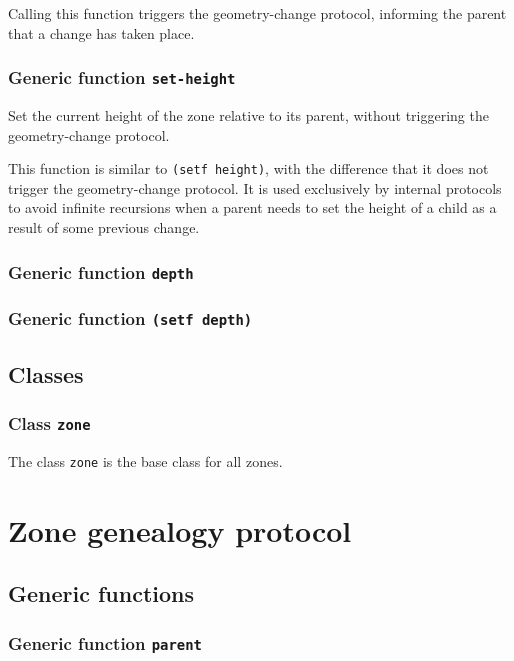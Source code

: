 \documentclass{report}
\begin{document}
Calling this function triggers the geometry-change protocol,
informing the parent that a change has taken place.

\subsubsection{Generic function \texttt{set-height}}

Set the current height of the zone relative to its parent, without
triggering the geometry-change protocol.

This function is similar to \texttt{(setf height)}, with the
difference that it does not trigger the geometry-change protocol.  It
is used exclusively by internal protocols to avoid infinite recursions
when a parent needs to set the height of a child as a result of some
previous change.

\subsubsection{Generic function \texttt{depth}}


\subsubsection{Generic function \texttt{(setf depth)}}

\subsection{Classes}

\subsubsection{Class \texttt{zone}}

The class \texttt{zone} is the base class for all zones. 


\section{Zone genealogy protocol}

\subsection{Generic functions}

\subsubsection{Generic function \texttt{parent}}
\end{document}
